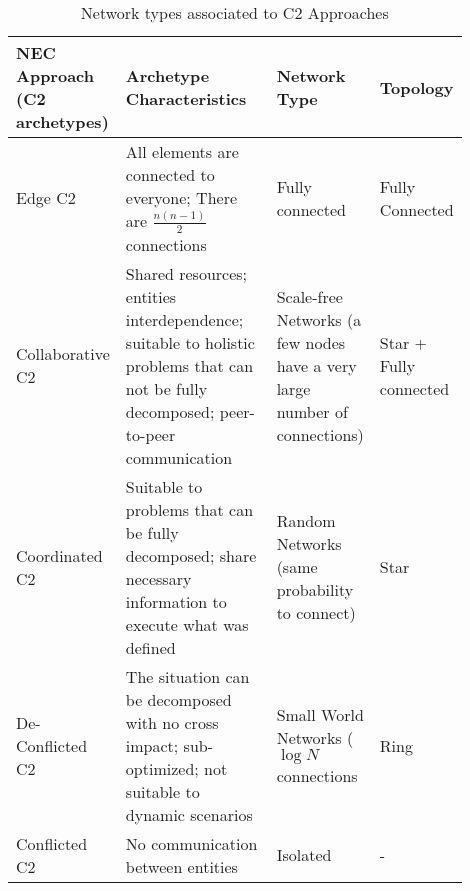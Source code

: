 \begin{table}[ht]
	\small
	\fontsize{6}{6}\selectfont
	\centering
	\caption{Network types associated to C2 Approaches}
	\label{table:nec}
	
	\begin{tabular}{p{0.1\linewidth}p{0.5\linewidth}p{0.2\linewidth}p{0.1\linewidth}}
	\hline
		\textbf{NEC Approach (C2 archetypes)}
		& \textbf{Archetype Characteristics}
		& \textbf{Network Type}
		& \textbf{Topology} \\ [1ex]
	\hline	
	Edge C2 & All elements are connected to everyone; There are $\frac{n(n-1)}{2}$ connections & Fully connected & Fully Connected \\[5ex]
	Collaborative C2 & Shared resources; entities interdependence; suitable to holistic problems that can not be fully decomposed; peer-to-peer communication & Scale-free Networks (a few nodes have a very large number of connections) & Star + Fully connected \\[5ex]
	Coordinated C2 & Suitable to problems that can be fully decomposed; share necessary information to execute what was defined & Random Networks (same probability to connect) & Star \\[5ex]
	De-Conflicted C2 & The situation can be decomposed with no cross impact; sub-optimized; not suitable to dynamic scenarios & Small World Networks ( $\log{N}$ connections & Ring \\[5ex]
	Conflicted C2 & No communication between entities & Isolated & - \\[1ex]
	\hline
	\end{tabular}
\end{table} 